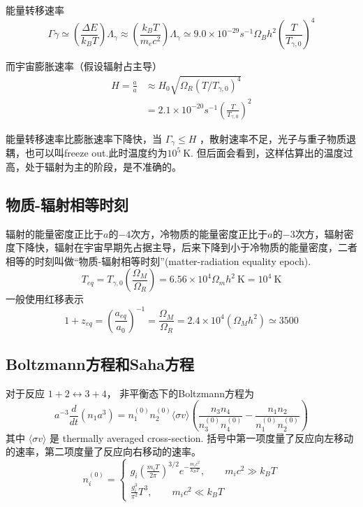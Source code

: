 \documentclass[12pt]{ctexart}
\begin{document}
能量转移速率
\begin{equation}
    \Gamma \gamma \simeq\left(\frac{\Delta E}{k_{B} T}\right) \Lambda_{\gamma} \approx\left(\frac{k_{B} T}{m_{e} c^{2}}\right) \Lambda_{\gamma} \simeq 9.0 \times 10^{-29} s^{-1} \Omega_{B} h^{2}\left(\frac{T}{T_{\gamma,{0}}}\right)^{4}
\end{equation}

而宇宙膨胀速率（假设辐射占主导）
\begin{equation}
    \begin{aligned}
        H=\frac{\dot{a}}{a} & \approx H_{0} \sqrt{\Omega_R\left(T / T_{\gamma,{0}}\right)^{4}} \\
    &=2.1\times 10^{-20} s^{-1} \left(\frac{T}{T_{\gamma,{0}}}\right)^{2}
    \end{aligned}
\end{equation}

能量转移速率比膨胀速率下降快，当 $\Gamma_{\gamma} \leq H$ ，散射速率不足，光子与重子物质退耦，也可以叫freeze out.此时温度约为$10^5 \mathrm{~K}$.
但后面会看到，这样估算出的温度过高，处于辐射为主的阶段，是不准确的。

\subsection*{物质-辐射相等时刻}
辐射的能量密度正比于$a$的$-4$次方，冷物质的能量密度正比于$a$的$-3$次方，辐射密度下降快，辐射在宇宙早期先占据主导，后来下降到小于冷物质的能量密度，二者相等的时刻叫做“物质-辐射相等时刻”(matter-radiation equality epoch).
\begin{equation}
    T_{eq}=T_{\gamma,0}\left(\frac{\Omega_{M}}{\Omega_{R}}\right)=6.56 \times 10^{4} \Omega_{m} h^{2} \mathrm{~K} =10^{4} \mathrm{~K}
\end{equation}
一般使用红移表示
\begin{equation}
    1+z_{eq}=\left(\frac{a_{e q}}{a_{0}}\right)^{-1}=\frac{\Omega_{M}}{\Omega_{R}}=2.4 \times 10^{4}\left(\Omega_M h^{2}\right) \simeq 3500
\end{equation}

\subsection*{Boltzmann方程和Saha方程}
对于反应 $1+2 \longleftrightarrow 3+4$，
非平衡态下的Boltzmann方程为
\begin{equation}
    a^{-3} \frac{d}{d t}\left(n_{1} a^{3}\right)=n_{1}^{(0)} n_{2}^{(0)}\langle\sigma v\rangle\left(\frac{n_{3} n_{4}}{n_{3}^{(0)} n_{4}^{(0)}}-\frac{n_{1} n_{2}}{n_{1}^{(0)} n_{2}^{(0)}}\right)
\end{equation}
其中 $\langle\sigma v\rangle$ 是 thermally averaged cross-section. 括号中第一项度量了反应向左移动的速率，第二项度量了反应向右移动的速率。
\begin{equation}
    n_{i}^{(0)}=\left\{\begin{array}{l}
    g_{i}\left(\frac{m_i T}{2 \pi}\right)^{3 / 2} e^{-\frac{m_{i} c^{2}}{k_{B} T}  }, \qquad m_{i} c^{2}\gg k_{B} T \\
    \frac{g_{i}^{3}}{\pi^{2}}T^3, \qquad m_{i} c^{2}\ll k_{B} T 
    \end{array}\right.
\end{equation}
\end{document}
